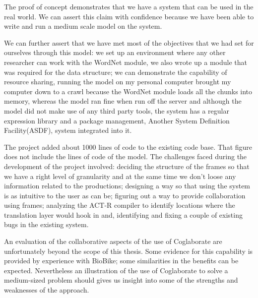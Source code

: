The proof of concept demonstrates that we have a system that can be
used in the real world. We can assert this claim with confidence
because we have been able to write and run a medium scale model on the
system. 

We can further assert that we have met most of the objectives that we
had set for ourselves through this model: we set up an environment
where any other researcher can work with the WordNet module, we also
wrote up a module that was required for the data structure; we can
demonstrate the capability of resource sharing, running the model on
my personal computer brought my computer down to a crawl because the
WordNet module loads all the chunks into memory, whereas the model ran
fine when run off the server and although the model did not make use
of any third party tools, the system has a regular expression library
and a package management, Another System Definition Facility(ASDF), 
system integrated into it.

The project added about 1000 lines of code to the existing code
base. That figure does not include the lines of code of the model. The
challenges faced during the development of the project involved:
deciding the structure of the frames so that we have a right level of
granularity and at the same time we don't loose any information
related to the productions; designing a way so that using the system
is as intuitive to the user as can be; figuring out a way to provide
collaboration using frames; analyzing the ACT-R compiler to identify
locations where the translation layer would hook in and, identifying
and fixing a couple of existing bugs in the existing system.

An evaluation of the collaborative aspects of the use of Coglaborate
are unfortunately beyond the scope of this thesis.  Some evidence for
this capability is provided by experience with BioBike; some
similarities in the benefits can be expected.  Nevertheless an
illustration of the use of Coglaborate to solve a medium-sized problem
should gives us insight into some of the strengths and weaknesses of
the approach.







